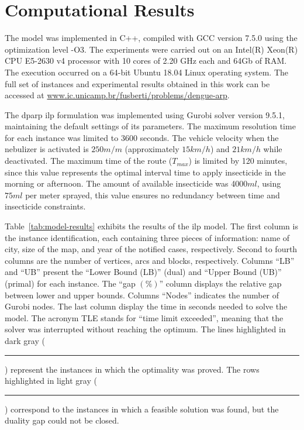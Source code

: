 \documentclass[a4paper,11pt]{article}
\newcommand\crule[3][black]{\textcolor{#1}{\rule{#2}{#3}}}
\newcommand{\midtilde}{\raisebox{-0.25\baselineskip}{\textasciitilde}}
\begin{document}
\section{Computational Results} \label{sec:computational-results}

The model  was implemented  in C++,  compiled with GCC  version 7.5.0  using the
optimization level -O3. The experiments were  carried out on an Intel(R) Xeon(R)
CPU E5-2630  v4 processor with 10  cores of 2.20 GHz  each and 64Gb of  RAM. The
execution occurred on a 64-bit Ubuntu 18.04 Linux operating system. The full set
of instances and  experimental results obtained in this work  can be accessed at
\href{www.ic.unicamp.br/~fusberti/problems/dengue-arp}{www.ic.unicamp.br/{\midtilde}fusberti/problems/dengue-arp}.

The  \gls{dparp}  \gls{ilp}  formulation  was implemented  using  Gurobi  solver
version 9.5.1, maintaining  the default settings of its  parameters. The maximum
resolution  time for  each instance  was limited  to 3600  seconds. The  vehicle
velocity when  the nebulizer is  activated is $250m/m$  (approximately $15km/h$)
and $21km/h$  while deactivated. The  maximum time  of the route  ($T_{max}$) is
limited by 120 minutes, since this value represents the optimal interval time to
apply  insecticide  in  the  morning  or  afternoon.  The  amount  of  available
insecticide was 4000$ml$, using $75ml$ per  meter sprayed, this value ensures no
redundancy between time and insecticide constraints.

Table~\ref{tab:model-results} exhibits  the results of the  \gls{ilp} model. The
first column  is the  instance identification, each  containing three  pieces of
information: name  of city,  size of the  map, and year  of the  notified cases,
respectively. Second  to fourth columns  are the  number of vertices,  arcs and
blocks, respectively. Columns ``LB'' and ``UB'' present the ``Lower Bound (LB)''
(dual) and ``Upper  Bound (UB)'' (primal) for each instance.  The ``gap $(\%)$''
column  displays  the relative  gap  between  lower  and upper  bounds.  Columns
``Nodes'' indicates the number of Gurobi nodes. The last column display the time
in seconds needed  to solve the model.  The acronym TLE stands  for ``time limit
exceeded'',  meaning  that  the  solver was  interrupted  without  reaching  the
optimum. The lines highlighted in dark gray (\crule[gr]{3mm}{3mm}) represent the
instances in which the optimality was proved. The rows highlighted in light gray
(\crule[lgr]{3mm}{3mm}) correspond to the instances in which a feasible solution
was found, but the duality gap could not be closed.
\end{document}
